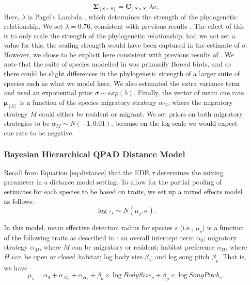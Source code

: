 \documentclass[12pt]{article}
\begin{document}
$$\mathbf{\Sigma}_{[S \times S]} = \mathbf{C}_{[S \times S]}\lambda\sigma.$$
Here, $\lambda$ is Pagel's Lambda \citep{pagel_inferring_1999}, which determines the strength of the phylogenetic relationship. 
We set $\lambda = 0.76$, consistent with previous results \cite{solymos_phylogeny_2018}. 
The effect of this is to only scale the strength of the phylogenetic relationship; had we not set a value for this, the scaling strength would have been captured in the estimate of $\sigma$. 
However, we chose to be explicit here consistent with previous results of \cite{solymos_phylogeny_2018}.
We note that the suite of species modelled in \citet{solymos_evaluating_2018} was primarily Boreal birds, and so there could be slight differences in the phylogenetic strength of a larger suite of species such as what we model here.
We also estimated the extra variance term and used an exponential prior $\sigma \sim exp(5)$.
Finally, the vector of mean cue rate $\mathbf{\mu}_{[S]}$ is a function of the species migratory strategy $\alpha_M$, where the migratory strategy $M$ could either be resident or migrant. 
We set priors on both migratory strategies to be $\alpha_M \sim N(-1, 0.01)$, because on the log scale we would expect cue rate to be negative. 

\subsubsection{Bayesian Hierarchical QPAD Distance Model}\label{section-distance-models}

\par \par Recall from Equation \ref{eq:distance} that the EDR $\tau$ determines the mixing parameter in a distance model setting.
To allow for the partial pooling of estimates for each species to be based on traits, we set up a mixed effects model as follows:
$$\log \tau_s \sim N(\mu_s, \sigma).$$

\par In this model, mean effective detection radius for species $s$ (i.e., $\mu_s$) is a function of the following traits as described in \cite{solymos_phylogeny_2018}: an overall intercept term $\alpha_0$; migratory strategy $\alpha_M$, where $M$ can be migratory or resident; habitat preference $\alpha_H$, where $H$ can be open or closed habitat; log body size $\beta_b$; and log song pitch $\beta_p$. 
That is, we have
$$ \mu_s = \alpha_0 + \alpha_{M_s} + \alpha_{H_s} + \beta_b \times \log BodySize_s + \beta_p \times \log SongPitch_s.$$
\end{document}
